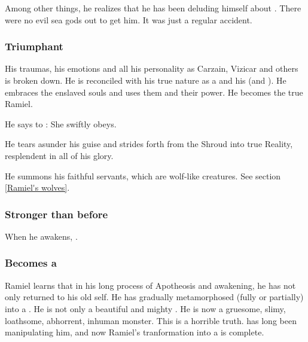 Among other things, he realizes that he has been deluding himself about . 
There were no evil sea gods out to get him. 
It was just a regular accident. 





\subsubsection{Triumphant}
His traumas, his emotions and all his personality as Carzain, Vizicar and others is broken down. 
He is reconciled with his true nature as a \sathariah{} and his \malach{}  (and ).  
He embraces the enslaved souls and uses them and their power. 
He becomes the true Ramiel. 

He says to \Cishiel:
She swiftly obeys. 


He tears asunder his \human{} guise and strides forth from the Shroud into true Reality, resplendent in all of his \sathariah{} glory. 

He summons his faithful servants, which are wolf-like creatures. See section \ref{Ramiel's wolves}. 





\subsubsection{Stronger than before}
When he awakens, . 





\subsubsection{Becomes a \neoresphan}
Ramiel learns that in his long process of Apotheosis and awakening, he has not only returned to his old self. 
He has gradually metamorphosed (fully or partially) into a \neoresphan.
He is not only a beautiful and mighty \resphan. 
He is now a gruesome, slimy, loathsome, abhorrent, inhuman monster. 
This is a horrible truth. 
\Azraid has long been manipulating him, and now Ramiel's tranformation into a \neoresphan is complete. 

